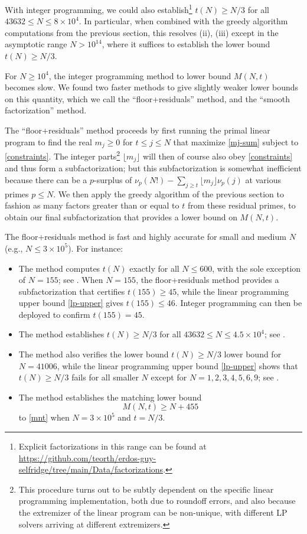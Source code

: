 \documentclass[12pt,a4paper,reqno]{amsart}
\numberwithin{equation}{section}
\theoremstyle{plain}
\theoremstyle{definition}
\begin{document}
With integer programming, we could also establish\footnote{Explicit factorizations in this range can be found at \url{https://github.com/teorth/erdos-guy-selfridge/tree/main/Data/factorizations}.} $t(N) \geq N/3$ for all $43632 \leq N \leq 8 \times 10^4$. 
  In particular, when combined with the greedy algorithm computations from the previous section, this resolves (ii), (iii) except in the asymptotic range $N > 10^{14}$, where it suffices to establish the lower bound $t(N) \geq N/3$.


For $N \geq 10^4$, the integer programming method to lower bound $M(N,t)$ becomes slow.  We found two faster methods to give slightly weaker lower bounds on this quantity, which we call the ``floor+residuals'' method, and the ``smooth factorization'' method.

The ``floor+residuals'' method proceeds by first running the primal linear program to find the real $m_j \geq 0$ for $t \leq j \leq N$ that maximize \eqref{mj-sum} subject to \eqref{constraints}.  The integer parts\footnote{This procedure turns out to be subtly dependent on the specific linear programming implementation, both due to roundoff errors, and also because the extremizer of the linear program can be non-unique, with different LP solvers arriving at different extremizers.} $\lfloor m_j \rfloor$ will then of course also obey \eqref{constraints} and thus form a subfactorization; but this subfactorization is somewhat inefficient because there can be a $p$-surplus of $\nu_p(N!) - \sum_{j \geq t} \lfloor m_j \rfloor \nu_p(j)$ at various primes $p \leq N$.  We then apply the greedy algorithm of the previous section to fashion as many factors greater than or equal to $t$ from these residual primes, to obtain our final subfactorization that provides a lower bound on $M(N,t)$.

The floor+residuals method is fast and highly accurate for small and medium $N$ (e.g., $N \leq 3 \times 10^5$).  For instance:
\begin{itemize}
  \item The method computes $t(N)$ exactly for all $N \leq 600$, with the sole exception of $N=155$; see .  When $N=155$, the floor+residuals method provides a subfactorization that certifies $t(155) \geq 45$, while the linear programming upper bound \eqref{lp-upper} gives $t(155) \leq 46$.  Integer programming can then be deployed to confirm $t(155)=45$.
  \item The method establishes $t(N) \geq N/3$ for all $43632 \leq N \leq 4.5 \times 10^4$; see .
  \item The method also verifies the lower bound $t(N)\geq N/3$ lower bound for $N=41006$, while the linear programming upper bound \eqref{lp-upper} shows that $t(N) \geq N/3$ fails for all smaller $N$ except for $N=1,2,3,4,5,6,9$; see .
  \item The method establishes the matching lower bound
\begin{equation}\label{mnt-lower}
M(N,t) \geq N + 455
\end{equation}
to \eqref{mnt} when $N = 3 \times 10^5$ and $t=N/3$.
\end{itemize}
\end{document}
